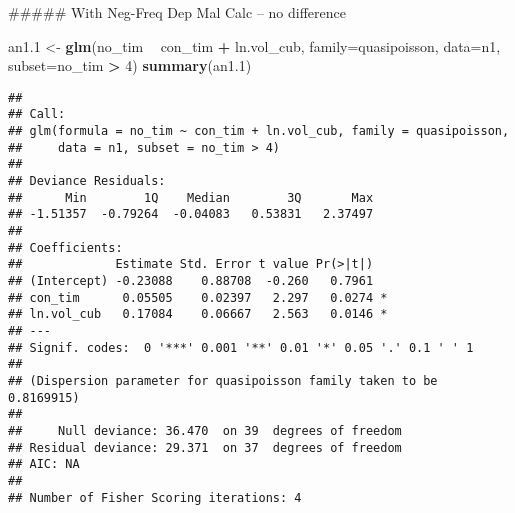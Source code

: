 \documentclass[]{article}
\newenvironment{Shaded}{\begin{snugshade}}{\end{snugshade}}
\newcommand{\KeywordTok}[1]{\textcolor[rgb]{0.13,0.29,0.53}{\textbf{#1}}}
\newcommand{\DataTypeTok}[1]{\textcolor[rgb]{0.13,0.29,0.53}{#1}}
\newcommand{\DecValTok}[1]{\textcolor[rgb]{0.00,0.00,0.81}{#1}}
\newcommand{\FloatTok}[1]{\textcolor[rgb]{0.00,0.00,0.81}{#1}}
\newcommand{\StringTok}[1]{\textcolor[rgb]{0.31,0.60,0.02}{#1}}
\newcommand{\OperatorTok}[1]{\textcolor[rgb]{0.81,0.36,0.00}{\textbf{#1}}}
\newcommand{\NormalTok}[1]{#1}
\begin{document}
\begin{Shaded}
\begin{Highlighting}[]
\NormalTok{##### With Neg-Freq Dep Mal Calc -- no difference}

\NormalTok{an1.}\DecValTok{1}\NormalTok{ <-}\StringTok{ }\KeywordTok{glm}\NormalTok{(no_tim }\OperatorTok{~}\StringTok{  }\NormalTok{con_tim }\OperatorTok{+}\StringTok{ }\NormalTok{ln.vol_cub,}
             \DataTypeTok{family=}\NormalTok{quasipoisson, }
           \DataTypeTok{data=}\NormalTok{n1, }\DataTypeTok{subset=}\NormalTok{no_tim }\OperatorTok{>}\StringTok{ }\DecValTok{4}\NormalTok{)}
\KeywordTok{summary}\NormalTok{(an1.}\DecValTok{1}\NormalTok{)}
\end{Highlighting}
\end{Shaded}

\begin{verbatim}
## 
## Call:
## glm(formula = no_tim ~ con_tim + ln.vol_cub, family = quasipoisson, 
##     data = n1, subset = no_tim > 4)
## 
## Deviance Residuals: 
##      Min        1Q    Median        3Q       Max  
## -1.51357  -0.79264  -0.04083   0.53831   2.37497  
## 
## Coefficients:
##             Estimate Std. Error t value Pr(>|t|)  
## (Intercept) -0.23088    0.88708  -0.260   0.7961  
## con_tim      0.05505    0.02397   2.297   0.0274 *
## ln.vol_cub   0.17084    0.06667   2.563   0.0146 *
## ---
## Signif. codes:  0 '***' 0.001 '**' 0.01 '*' 0.05 '.' 0.1 ' ' 1
## 
## (Dispersion parameter for quasipoisson family taken to be 0.8169915)
## 
##     Null deviance: 36.470  on 39  degrees of freedom
## Residual deviance: 29.371  on 37  degrees of freedom
## AIC: NA
## 
## Number of Fisher Scoring iterations: 4
\end{verbatim}

\begin{Shaded}
\end{Shaded}
\end{document}
